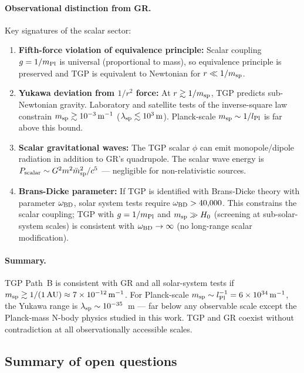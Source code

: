 \paragraph{Observational distinction from GR.}
Key signatures of the scalar sector:
\begin{enumerate}
\item \textbf{Fifth-force violation of equivalence principle:}
  Scalar coupling $g=1/m_{\rm Pl}$ is universal (proportional to mass),
  so equivalence principle is preserved and TGP is equivalent to Newtonian
  for $r\ll1/m_{\rm sp}$.
\item \textbf{Yukawa deviation from $1/r^2$ force:}
  At $r\gtrsim1/m_{\rm sp}$, TGP predicts sub-Newtonian gravity.
  Laboratory and satellite tests of the inverse-square law constrain
  $m_{\rm sp}\gtrsim10^{-3}\,{\rm m}^{-1}$ ($\lambda_{\rm sp}\lesssim10^3\,{\rm m}$).
  Planck-scale $m_{\rm sp}\sim1/l_{\rm Pl}$ is far above this bound.
\item \textbf{Scalar gravitational waves:}
  The TGP scalar $\phi$ can emit monopole/dipole radiation in addition
  to GR's quadrupole.  The scalar wave energy is
  $P_{\rm scalar}\sim G^2 m^2 \ddot{m}^2_{\rm sp}/c^5$ — negligible
  for non-relativistic sources.
\item \textbf{Brans-Dicke parameter:}
  If TGP is identified with Brans-Dicke theory with parameter
  $\omega_{\rm BD}$, solar system tests require $\omega_{\rm BD}>40{,}000$.
  This constrains the scalar coupling; TGP with $g=1/m_{\rm Pl}$
  and $m_{\rm sp}\gg H_0$ (screening at sub-solar-system scales)
  is consistent with $\omega_{\rm BD}\to\infty$ (no long-range scalar modification).
\end{enumerate}

\paragraph{Summary.}
TGP Path~B is consistent with GR and all solar-system tests if
$m_{\rm sp}\gtrsim1/(1\,{\rm AU})\approx7\times10^{-12}\,{\rm m}^{-1}$.
For Planck-scale $m_{\rm sp}\sim l_{\rm Pl}^{-1}=6\times10^{34}\,{\rm m}^{-1}$,
the Yukawa range is $\lambda_{\rm sp}\sim10^{-35}$~m — far below any
observable scale except the Planck-mass N-body physics studied in this work.
TGP and GR coexist without contradiction at all observationally accessible scales.

\subsection{Summary of open questions}


